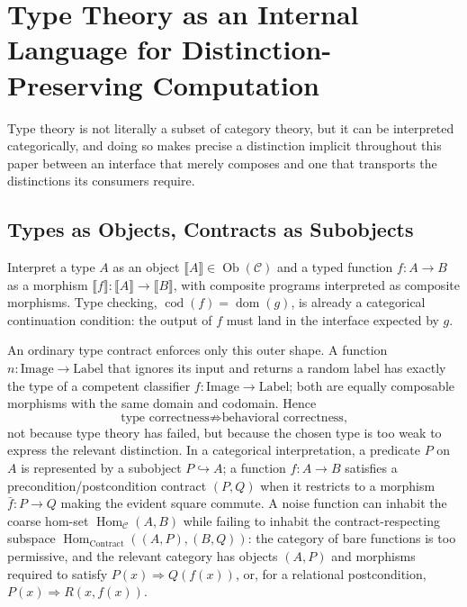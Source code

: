 \documentclass[11pt]{article}
\begin{document}
\section{Type Theory as an Internal Language for Distinction-Preserving Computation}
\label{app:types}

Type theory is not literally a subset of category theory, but it can be interpreted categorically, and doing so makes precise a distinction implicit throughout this paper between an interface that merely composes and one that transports the distinctions its consumers require.

\subsection{Types as Objects, Contracts as Subobjects}

Interpret a type $A$ as an object $\llbracket A \rrbracket \in \operatorname{Ob}(\mathcal{C})$ and a typed function $f : A \to B$ as a morphism $\llbracket f \rrbracket : \llbracket A \rrbracket \to \llbracket B \rrbracket$, with composite programs interpreted as composite morphisms. Type checking, $\operatorname{cod}(f) = \operatorname{dom}(g)$, is already a categorical continuation condition: the output of $f$ must land in the interface expected by $g$.

An ordinary type contract enforces only this outer shape. A function $n : \mathrm{Image} \to \mathrm{Label}$ that ignores its input and returns a random label has exactly the type of a competent classifier $f : \mathrm{Image} \to \mathrm{Label}$; both are equally composable morphisms with the same domain and codomain. Hence
\[
\text{type correctness} \not\Rightarrow \text{behavioral correctness,}
\]
not because type theory has failed, but because the chosen type is too weak to express the relevant distinction. In a categorical interpretation, a predicate $P$ on $A$ is represented by a subobject $P \hookrightarrow A$; a function $f : A \to B$ satisfies a precondition/postcondition contract $(P,Q)$ when it restricts to a morphism $\bar{f} : P \to Q$ making the evident square commute. A noise function can inhabit the coarse hom-set $\operatorname{Hom}_{\mathcal{C}}(A,B)$ while failing to inhabit the contract-respecting subspace $\operatorname{Hom}_{\mathrm{Contract}}((A,P),(B,Q))$: the category of bare functions is too permissive, and the relevant category has objects $(A,P)$ and morphisms required to satisfy $P(x) \Rightarrow Q(f(x))$, or, for a relational postcondition, $P(x) \Rightarrow R(x, f(x))$.
\end{document}
